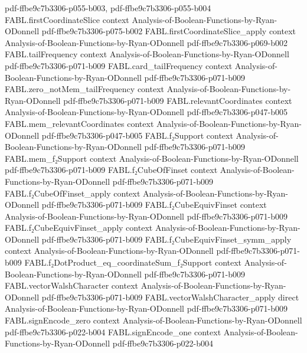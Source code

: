 \begin{theorem}
  {pdf-ffbe9c7b3306-p055-b003,
    pdf-ffbe9c7b3306-p055-b004}
\proofstep
  {FABL.firstCoordinateSlice}
  {context}
  {Analysis-of-Boolean-Functions-by-Ryan-ODonnell}
  {pdf-ffbe9c7b3306-p075-b002}
\proofstep
  {FABL.firstCoordinateSlice_apply}
  {context}
  {Analysis-of-Boolean-Functions-by-Ryan-ODonnell}
  {pdf-ffbe9c7b3306-p069-b002}
\proofstep
  {FABL.tailFrequency}
  {context}
  {Analysis-of-Boolean-Functions-by-Ryan-ODonnell}
  {pdf-ffbe9c7b3306-p071-b009}
\proofstep
  {FABL.card_tailFrequency}
  {context}
  {Analysis-of-Boolean-Functions-by-Ryan-ODonnell}
  {pdf-ffbe9c7b3306-p071-b009}
\proofstep
  {FABL.zero_notMem_tailFrequency}
  {context}
  {Analysis-of-Boolean-Functions-by-Ryan-ODonnell}
  {pdf-ffbe9c7b3306-p071-b009}
\proofstep
  {FABL.relevantCoordinates}
  {context}
  {Analysis-of-Boolean-Functions-by-Ryan-ODonnell}
  {pdf-ffbe9c7b3306-p047-b005}
\proofstep
  {FABL.mem_relevantCoordinates}
  {context}
  {Analysis-of-Boolean-Functions-by-Ryan-ODonnell}
  {pdf-ffbe9c7b3306-p047-b005}
\proofstep
  {FABL.f₂Support}
  {context}
  {Analysis-of-Boolean-Functions-by-Ryan-ODonnell}
  {pdf-ffbe9c7b3306-p071-b009}
\proofstep
  {FABL.mem_f₂Support}
  {context}
  {Analysis-of-Boolean-Functions-by-Ryan-ODonnell}
  {pdf-ffbe9c7b3306-p071-b009}
\proofstep
  {FABL.f₂CubeOfFinset}
  {context}
  {Analysis-of-Boolean-Functions-by-Ryan-ODonnell}
  {pdf-ffbe9c7b3306-p071-b009}
\proofstep
  {FABL.f₂CubeOfFinset_apply}
  {context}
  {Analysis-of-Boolean-Functions-by-Ryan-ODonnell}
  {pdf-ffbe9c7b3306-p071-b009}
\proofstep
  {FABL.f₂CubeEquivFinset}
  {context}
  {Analysis-of-Boolean-Functions-by-Ryan-ODonnell}
  {pdf-ffbe9c7b3306-p071-b009}
\proofstep
  {FABL.f₂CubeEquivFinset_apply}
  {context}
  {Analysis-of-Boolean-Functions-by-Ryan-ODonnell}
  {pdf-ffbe9c7b3306-p071-b009}
\proofstep
  {FABL.f₂CubeEquivFinset_symm_apply}
  {context}
  {Analysis-of-Boolean-Functions-by-Ryan-ODonnell}
  {pdf-ffbe9c7b3306-p071-b009}
\proofstep
  {FABL.f₂DotProduct_eq_coordinateSum_f₂Support}
  {context}
  {Analysis-of-Boolean-Functions-by-Ryan-ODonnell}
  {pdf-ffbe9c7b3306-p071-b009}
\proofstep
  {FABL.vectorWalshCharacter}
  {context}
  {Analysis-of-Boolean-Functions-by-Ryan-ODonnell}
  {pdf-ffbe9c7b3306-p071-b009}
\proofstep
  {FABL.vectorWalshCharacter_apply}
  {direct}
  {Analysis-of-Boolean-Functions-by-Ryan-ODonnell}
  {pdf-ffbe9c7b3306-p071-b009}
\proofstep
  {FABL.signEncode_zero}
  {context}
  {Analysis-of-Boolean-Functions-by-Ryan-ODonnell}
  {pdf-ffbe9c7b3306-p022-b004}
\proofstep
  {FABL.signEncode_one}
  {context}
  {Analysis-of-Boolean-Functions-by-Ryan-ODonnell}
  {pdf-ffbe9c7b3306-p022-b004}

\end{theorem}
